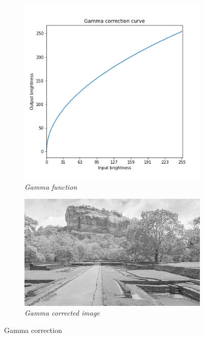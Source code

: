 \documentclass[11pt, a4paper]{article}
\begin{document}
\begin{minipage}{.6\textwidth}
\begin{figure}[H]
	\centering
	\begin{subfigure}[b]{0.39\textwidth}
		\centering
		\includegraphics[width=\textwidth]{./Outputs/Gamma_correction.png}
		\caption{{\small \textit{Gamma function}}}
		\label{fig:Gamma Function}
	\end{subfigure}
	\hfill
	\begin{subfigure}[b]{0.59\textwidth}
		\centering
		\includegraphics[width=\textwidth]{./Outputs/Gamma_Image.png}
		\caption{{\small \textit{Gamma corrected image}}}
		\label{fig:Gamma Image}
	\end{subfigure}
	\caption{Gamma correction}
\end{figure}
\end{minipage}
\end{document}
